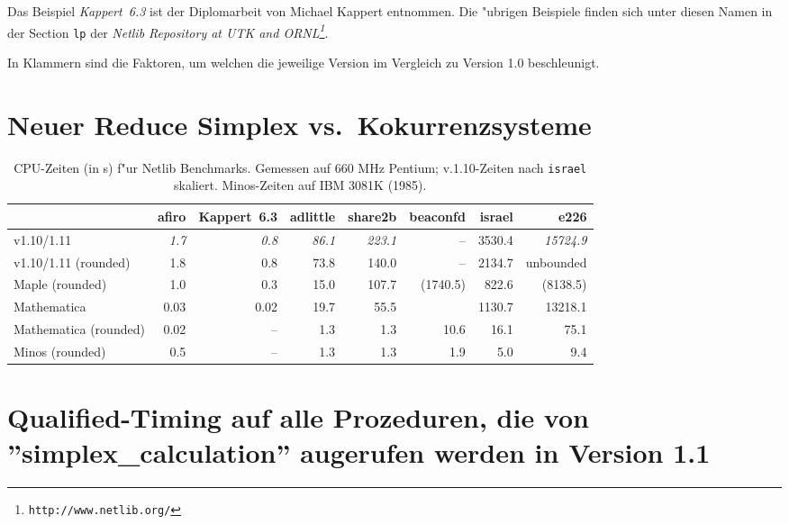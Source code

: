 \documentclass[a4paper]{article}
\begin{document}
Das Beispiel \textit{Kappert~6.3} ist der Diplomarbeit von Michael
Kappert entnommen. Die "ubrigen Beispiele finden sich unter diesen
Namen in der Section \texttt{lp} der \emph{Netlib Repository at UTK and
ORNL\footnote{\texttt{http://www.netlib.org/}}}.

In Klammern sind die Faktoren, um welchen die jeweilige Version im
Vergleich zu Version 1.0 beschleunigt.

\section{Neuer Reduce Simplex vs.~Kokurrenzsysteme}
\begin{table}[h]
\begin{small}
\caption{CPU-Zeiten (in s) f"ur Netlib
Benchmarks. Gemessen auf 660 MHz Pentium; v.1.10-Zeiten nach
\texttt{israel} skaliert. Minos-Zeiten auf IBM 3081K (1985).}
\begin{tabular}{lrrrrrrr}
\hline
 & afiro & Kappert~6.3 & adlittle & share2b & beaconfd & israel & e226\\
\hline
v1.10/1.11
 &\textit{1.7}&\textit{0.8}&\textit{86.1}&\textit{223.1}&--&3530.4&\textit{15724.9}\\
v1.10/1.11 (rounded) & 1.8 & 0.8& 73.8 & 140.0&--&2134.7&unbounded\\
Maple (rounded) &1.0&0.3&15.0&107.7&(1740.5)&822.6&(8138.5)\\
Mathematica &0.03&0.02&19.7&55.5&&1130.7&13218.1\\
Mathematica (rounded) &0.02&--&1.3&1.3&10.6&16.1&75.1\\
\hline
Minos (rounded) &0.5&--&1.3&1.3&1.9&5.0&9.4\\
\hline
\end{tabular}
\end{small}
\end{table}

\section{Qualified-Timing auf alle Prozeduren, die von ''simplex\_calculation'' augerufen werden in Version 1.1}
\end{document}
